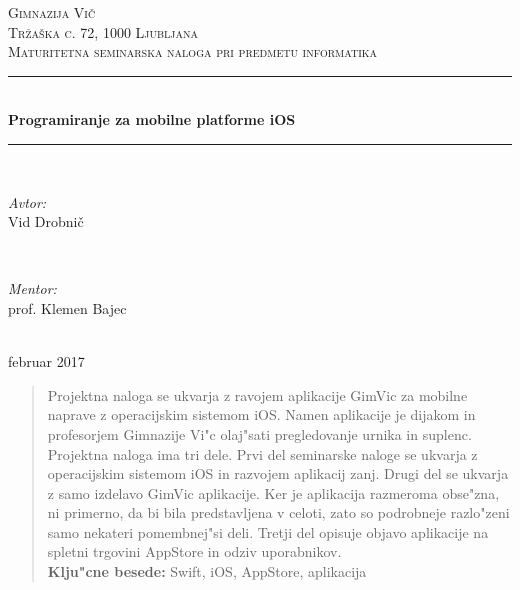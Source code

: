 \documentclass[a4paper, 12pt]{article}
\begin{document}
	\begin{titlepage}
		\newcommand{\HRule}{\rule{\linewidth}{0.5mm}}
		\center

		\textsc{\LARGE Gimnazija Vič}\\[0.5cm]
		\textsc{\Large Tržaška c. 72, 1000 Ljubljana}\\[0.5cm]
		\textsc{\Large Maturitetna seminarska naloga pri predmetu informatika}\\[1cm]

		\HRule \\[0.4cm]
		{ \huge \bfseries Programiranje za mobilne platforme iOS}\\[0.4cm]
		\HRule \\[1.5cm]

		\begin{minipage}{0.4\textwidth}
			\begin{flushleft} \large
				\emph{Avtor:}\\
				Vid Drobnič
			\end{flushleft}
		\end{minipage}
		~
		\begin{minipage}{0.4\textwidth}
			\begin{flushright} \large
				\emph{Mentor:} \\
				prof. Klemen Bajec
			\end{flushright}
		\end{minipage}\\[4cm]

		{\large februar 2017}\\[3cm]
		\vfill
	\end{titlepage}

	\begin{abstract}
		\noindent Projektna naloga se ukvarja z ravojem aplikacije GimVic za mobilne naprave z operacijskim sistemom iOS. Namen aplikacije je dijakom in profesorjem Gimnazije Vi"c olaj"sati pregledovanje urnika in suplenc. Projektna naloga ima tri dele. Prvi del seminarske naloge se ukvarja z operacijskim sistemom iOS in razvojem aplikacij zanj. Drugi del se ukvarja z samo izdelavo GimVic aplikacije. Ker je aplikacija razmeroma obse"zna, ni primerno, da bi bila predstavljena v celoti, zato so podrobneje razlo"zeni samo nekateri pomembnej"si deli. Tretji del opisuje objavo aplikacije na spletni trgovini AppStore in odziv uporabnikov.\\
		
		\noindent \textbf{Klju"cne besede:} Swift, iOS, AppStore, aplikacija
	\end{abstract}
\end{document}
